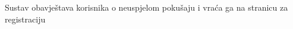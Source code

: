 \begin{packed_item}
\begin{packed_item}
							\item[] \begin{packed_enum}
								\item Sustav obavještava korisnika o neuspjelom pokušaju i vraća ga na stranicu za registraciju 
									\end{packed_enum}
							
						\end{packed_item}
					\end{packed_item}



